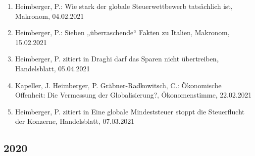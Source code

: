 \begin{enumerate}
	 \item Heimberger, P.: Wie stark der globale Steuerwettbewerb tatsächlich ist, Makronom, 04.02.2021
	 \item Heimberger, P.: Sieben „überraschende“ Fakten zu Italien, Makronom, 15.02.2021
	 \item Heimberger, P. zitiert in Draghi darf das Sparen nicht übertreiben, Handelsblatt, 05.04.2021
	 \item Kapeller, J. Heimberger, P. Gräbner-Radkowitsch, C.: Ökonomische Offenheit: Die Vermessung der Globalisierung?, Ökonomenstimme, 22.02.2021
	 \item Heimberger, P. zitiert in Eine globale Mindeststeuer stoppt die Steuerflucht der Konzerne, Handelsblatt, 07.03.2021
\end{enumerate}
\subsection*{2020}
